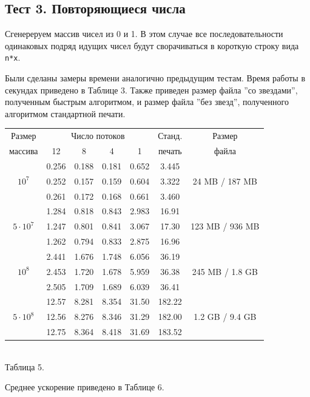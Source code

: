 \subsection{Тест 3. Повторяющиеся числа}
Сгенереруем массив чисел из 0 и 1.
В этом случае все последовательности одинаковых подряд идущих чисел будут сворачиваться в короткую строку вида \texttt{n*x}.

Были сделаны замеры времени аналогично предыдущим тестам.
Время работы в секундах приведено в Таблице 3.
Также приведен размер файла ''со звездами'', полученным быстрым алгоритмом, и размер файла ''без звезд'', полученного алгоритмом стандартной печати.
\begin{center}
\begin{tabular}{||c|c|c|c|c|c|c||}
\hline
\hline
Размер & \multicolumn{4}{c|}{Число потоков} & Станд. & Размер \\
\hhline{~|-|-|-|-|~|~|}
массива & 12 & 8 & 4 & 1 & печать  & файла\\
\hline
\hline
& 0.256 & 0.188 & 0.181 & 0.652 & 3.445  &\\
\hhline{~|-|-|-|-|-|}
$10^7$ & 0.252 & 0.157 & 0.159 & 0.604 & 3.322  & 24 MB / 187 MB \\
\hhline{~|-|-|-|-|-|}
& 0.261 & 0.172 & 0.168 & 0.661 & 3.460  &\\
\hline
& 1.284 & 0.818 & 0.843 & 2.983 & 16.91  &\\
\hhline{~|-|-|-|-|-|}
$5 \cdot 10^7$ & 1.247 & 0.801 & 0.841 & 3.067 & 17.30  & 123 MB / 936 MB\\
\hhline{~|-|-|-|-|-|}
& 1.262 & 0.794 & 0.833 & 2.875 & 16.96 & \\
\hline
& 2.441 & 1.676 & 1.748 & 6.056 & 36.19 &\\
\hhline{~|-|-|-|-|-|}
$10^8$ & 2.453 & 1.720 & 1.678 & 5.959 & 36.38  & 245 MB / 1.8 GB\\
\hhline{~|-|-|-|-|-|}
& 2.505 & 1.709 & 1.689 & 6.039 &  36.41  &\\
\hline
& 12.57 & 8.281 & 8.354 & 31.50 & 182.22  &\\
\hhline{~|-|-|-|-|-|}
$5 \cdot 10^8$ & 12.56 & 8.276 & 8.346 & 31.29 & 182.00  & 1.2 GB / 9.4 GB\\
\hhline{~|-|-|-|-|-|}
& 12.75  & 8.364 & 8.418 & 31.69 & 183.52  &\\
\hline
\hline
\end{tabular}
\\\vspace{10pt}
\small{Таблица 5.}
\end{center}
Среднее ускорение приведено в Таблице 6.


